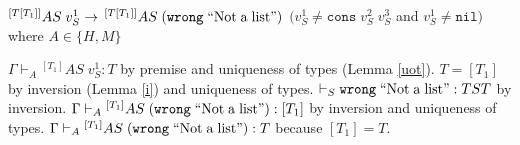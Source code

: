\begin{case}
$^{[T[T_{1}]]}AS\;v_{S}^{1}\rightarrow\,^{[T[T_{1}]]}AS\;(\mathtt{wrong}\;\mathrm{``Not\;a\;list"})$ $(v_{S}^{1}\neq\mathtt{cons}\;v_{S}^{2}\;v_{S}^{3}$ and $v_{S}^{1}\neq\mathtt{nil})$ where $A\in\lbrace H,M\rbrace$

$\Gamma\vdash_{A}{^{[T_{1}]}AS}\;v_{S}^{1}:T$ by premise and uniqueness of types (Lemma \ref{uot}).  $T=[T_{1}]$ by inversion (Lemma \ref{i}) and uniqueness of types.  $\vdash_{S}\mathtt{wrong}\;\mathrm{``Not\;a\;list"}:TST$ by inversion.  $\Gamma\vdash_{A}{^{[T_{1}]}A}S\;(\mathtt{wrong}\;\mathrm{``Not\;a\;list"}):[T_{1}]$ by inversion and uniqueness of types.  $\Gamma\vdash_{A}{^{[T_{1}]}A}S\;(\mathtt{wrong}\;\mathrm{``Not\;a\;list"}):T$ because $[T_{1}]=T$.
\end{case}